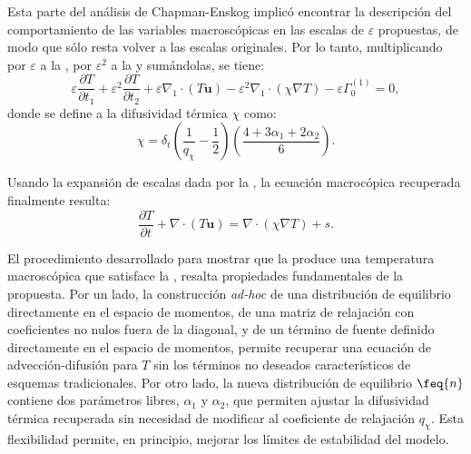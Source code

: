 Esta parte del an\'alisis de Chapman-Enskog implic\'o encontrar la descripci\'on del comportamiento de las variables macrosc\'opicas en las escalas de $\varepsilon$ propuestas, de modo que s\'olo resta volver a las escalas originales. Por lo tanto, multiplicando por $\varepsilon$ a la , por $\varepsilon^2$ a la  y sum\'andolas, se tiene:
\begin{equation}
	\varepsilon \dfrac{\partial T}{\partial t_1} + \varepsilon^2 \dfrac{\partial T}{\partial t_2} + \varepsilon \nabla_1 \cdot (T\bm{u}) - \varepsilon^2 \nabla_1 \cdot (\chi \nabla T) - \varepsilon \Gamma_0^{(1)} = 0,
\end{equation}
donde se define a la difusividad t\'ermica $\chi$ como:
\begin{equation}
	\chi = \delta_t \left( \dfrac{1}{q_{\chi}} - \dfrac{1}{2} \right) \left( \dfrac{4+3\alpha_1 + 2\alpha_2}{6} \right).
	\label{eq:modelo_2d_chi}
\end{equation}

Usando la expansi\'on de escalas dada por la , la ecuaci\'on macroc\'opica recuperada finalmente resulta:
\begin{equation}
	\dfrac{\partial T}{\partial t} + \nabla \cdot (T\bm{u}) = \nabla \cdot (\chi \nabla T) + s.
	\label{eq:T_2d}
\end{equation}

El procedimiento desarrollado para mostrar que la  produce una temperatura macrosc\'opica que satisface la , resalta propiedades fundamentales de la propuesta. Por un lado, la construcci\'on \emph{ad-hoc} de una distribuci\'on de equilibrio directamente en el espacio de momentos, de una matriz de relajaci\'on con coeficientes no nulos fuera de la diagonal, y de un t\'ermino de fuente definido directamente en el espacio de momentos, permite recuperar una ecuaci\'on de advecci\'on-difusi\'on para $T$ sin los t\'erminos no deseados caracter\'isticos de esquemas tradicionales. Por otro lado, la nueva distribuci\'on de equilibrio $\feq{n}$ contiene dos par\'ametros libres, $\alpha_1$ y $\alpha_2$, que permiten ajustar la difusividad t\'ermica recuperada sin necesidad de modificar al coeficiente de relajaci\'on $q_{\chi}$. Esta flexibilidad permite, en principio, mejorar los l\'imites de estabilidad del modelo.

